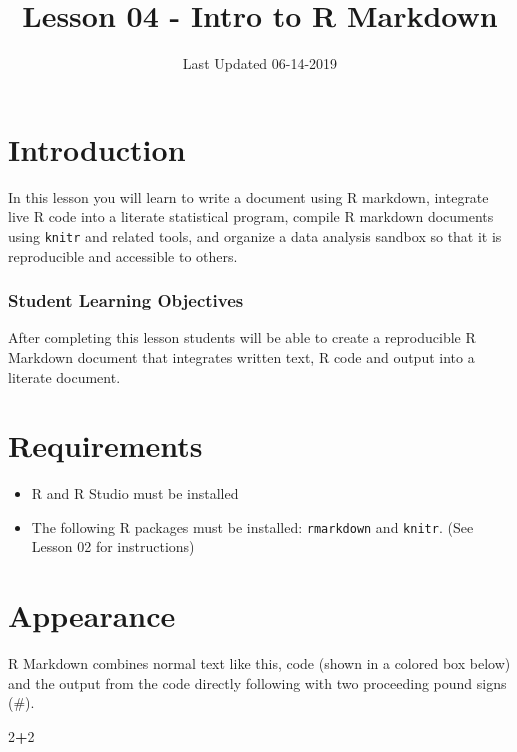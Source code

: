 \documentclass[]{article}
\title{Lesson 04 - Intro to R Markdown}
\author{}
\date{Last Updated 06-14-2019}
\newenvironment{Shaded}{\begin{snugshade}}{\end{snugshade}}
\newcommand{\DecValTok}[1]{\textcolor[rgb]{0.00,0.00,0.81}{#1}}
\newcommand{\OperatorTok}[1]{\textcolor[rgb]{0.81,0.36,0.00}{\textbf{#1}}}
\providecommand{\tightlist}{%
  \setlength{\itemsep}{0pt}\setlength{\parskip}{0pt}}
\begin{document}
\maketitle

\hypertarget{introduction}{%
\section{Introduction}\label{introduction}}

In this lesson you will learn to write a document using R markdown,
integrate live R code into a literate statistical program, compile R
markdown documents using \texttt{knitr} and related tools, and organize
a data analysis sandbox so that it is reproducible and accessible to
others.

\hypertarget{student-learning-objectives}{%
\subsubsection{Student Learning
Objectives}\label{student-learning-objectives}}

After completing this lesson students will be able to create a
reproducible R Markdown document that integrates written text, R code
and output into a literate document.

\hypertarget{requirements}{%
\section{Requirements}\label{requirements}}

\begin{itemize}
\tightlist
\item
  R and R Studio must be installed
\item
  The following R packages must be installed: \texttt{rmarkdown} and
  \texttt{knitr}. (See Lesson 02 for instructions)
\end{itemize}

\hypertarget{appearance}{%
\section{Appearance}\label{appearance}}

R Markdown combines normal text like this, code (shown in a colored box
below) and the output from the code directly following with two
proceeding pound signs (\#).

\begin{Shaded}
\begin{Highlighting}[]
\DecValTok{2}\OperatorTok{+}\DecValTok{2}
\end{Highlighting}
\end{Shaded}
\end{document}
